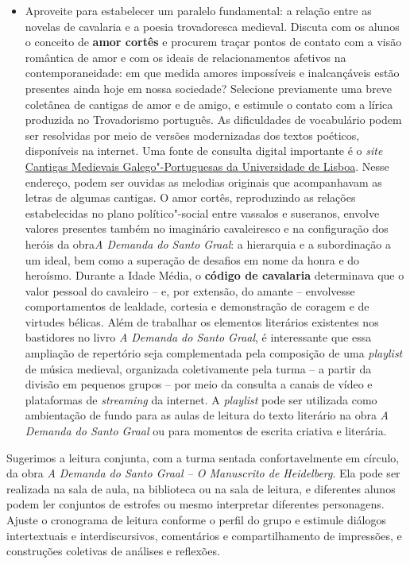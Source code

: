 \documentclass[11pt]{extarticle}
\begin{document}
\begin{itemize}
\item
  Aproveite para estabelecer um paralelo fundamental: a relação entre as
  novelas de cavalaria e a poesia trovadoresca medieval. Discuta com os
  alunos o conceito de \textbf{amor cortês} e procurem traçar pontos de
  contato com a visão romântica de amor e com os ideais de
  relacionamentos afetivos na contemporaneidade: em que medida amores
  impossíveis e inalcançáveis estão presentes ainda hoje em nossa
  sociedade? Selecione previamente uma breve coletânea de cantigas de
  amor e de amigo, e estimule o contato com a lírica produzida no
  Trovadorismo português. As dificuldades de vocabulário podem ser
  resolvidas por meio de versões modernizadas dos textos poéticos,
  disponíveis na internet. Uma fonte de consulta digital importante é o
  \emph{site} \href{https://cantigas.fcsh.unl.pt/listacantigas.asp}{Cantigas Medievais Galego"-Portuguesas da Universidade
  de Lisboa}. Nesse endereço, podem ser ouvidas as melodias
  originais que acompanhavam as letras de algumas cantigas. O amor
  cortês, reproduzindo as relações estabelecidas no plano
  político"-social entre vassalos e suseranos, envolve valores presentes
  também no imaginário cavaleiresco e na configuração dos heróis
  da obra\emph{A Demanda do Santo Graal}: a hierarquia e a subordinação a um ideal, bem como
  a superação de desafios em nome da honra e do heroísmo. Durante a
  Idade Média, o \textbf{código de cavalaria} determinava que o valor
  pessoal do cavaleiro -- e, por extensão, do amante -- envolvesse
  comportamentos de lealdade, cortesia e demonstração de coragem e de
  virtudes bélicas. Além de trabalhar os elementos literários existentes
  nos bastidores no livro \emph{A Demanda do Santo Graal}, é interessante que
  essa ampliação de repertório seja complementada pela composição de uma
  \emph{playlist} de música medieval, organizada coletivamente pela
  turma -- a partir da divisão em pequenos grupos -- por meio da
  consulta a canais de vídeo e plataformas de \emph{streaming} da
  internet. A \emph{playlist} pode ser utilizada como ambientação de
  fundo para as aulas de leitura do texto literário na obra \emph{A Demanda do Santo Graal}
  ou para momentos de escrita criativa e literária.
\end{itemize}

Sugerimos a leitura conjunta, com a turma sentada
confortavelmente em círculo, da obra \emph{A Demanda do Santo Graal -- O
Manuscrito de Heidelberg}. Ela pode ser realizada na sala de aula, na
biblioteca ou na sala de leitura, e diferentes alunos podem ler
conjuntos de estrofes ou mesmo interpretar diferentes personagens.
Ajuste o cronograma de leitura conforme o perfil do grupo e estimule
diálogos intertextuais e interdiscursivos, comentários e
compartilhamento de impressões, e construções coletivas de análises e
reflexões.
\end{document}
